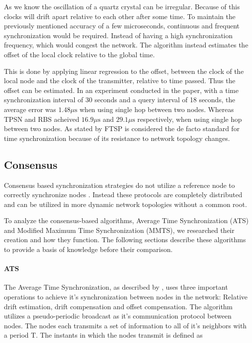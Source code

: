 \documentclass[a4paper,12pt]{article}
\begin{document}
    
    As we know the oscillation of a quartz crystal can be irregular. Because of this clocks will drift apart relative to each other after some time. To maintain the previously mentioned accuracy of a few microseconds, continuous and frequent synchronization would be required. Instead of having a high synchronization frequency, which would congest the network. The algorithm instead estimates the offset of the local clock relative to the global time. 
    
    
    This is done by applying linear regression to the offset, between the clock of the local node and the clock of the transmitter, relative to time passed. Thus the offset can be estimated. In an experiment conducted in the paper, with a time synchronization interval of 30 seconds and a query interval of 18 seconds, the average error was $1.48 \mu \text{s}$ when using single hop between two nodes. Whereas TPSN and RBS acheived $16.9 \mu \text{s}$ and $29.1 \mu \text{s}$ respectively, when using single hop between two nodes. As stated by \cite{LucaFiorentin11} FTSP is considered the de facto standard for time synchronization because of its resistance to network topology changes.   
    
    
    \subsection{Consensus}
    Consensus based synchronization strategies do not utilize a reference node to correctly synchronize nodes \cite{HeLiChenCheng13}. Instead these protocols are completely distributed and can be utilized in more dynamic network topologies without a common root.
    
    To analyze the consensus-based algorithms, Average Time Synchronization (ATS) and Modified Maximum Time Synchronization (MMTS), we researched their creation and how they function. The following sections describe these algorithms to provide a basis of knowledge before their comparison.
    
    \paragraph{ATS} The Average Time Synchronization, as described by \citet{LucaFiorentin11}, uses three important operations to achieve it's synchronization between nodes in the network: Relative drift estimation, drift compensation and offset compensation. The algorithm utilizes a pseudo-periodic broadcast as it's communication protocol between nodes. The nodes each transmits a set of information to all of it's neighbors with a period $\mathrm{T}$. The instants in which the nodes transmit is defined as 
    
\end{document}

